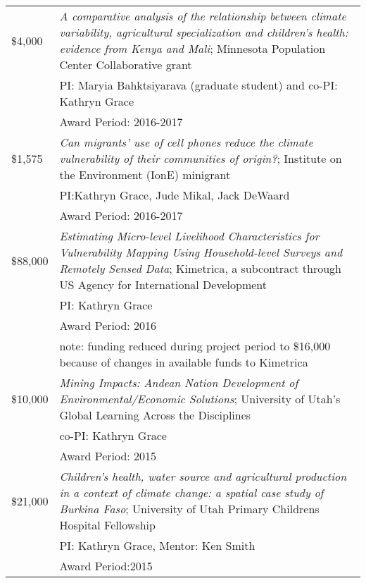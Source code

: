 \documentclass[11pt]{article} %
\begin{document}
\begin{tabular}{lp{11cm}}

\$4,000& \emph{A comparative analysis of the relationship between climate variability, agricultural specialization and children's health:  evidence from Kenya and Mali}; Minnesota Population Center Collaborative grant\\
&PI: Maryia Bahktsiyarava (graduate student) and co-PI: Kathryn Grace\\
&Award Period: 2016-2017\\




\$1,575& \emph{Can migrants' use of cell phones reduce the climate vulnerability of their communities of origin?}; Institute on the Environment (IonE) minigrant\\
&PI:Kathryn Grace, Jude Mikal, Jack DeWaard\\
&Award Period: 2016-2017\\






\$88,000& \emph{Estimating Micro-level Livelihood Characteristics for Vulnerability Mapping Using Household-level Surveys and Remotely Sensed Data}; Kimetrica, a subcontract through US Agency for International Development\\
&PI: Kathryn Grace\\
&Award Period: 2016\\
&note: funding reduced during project period to \$16,000 because of changes in available funds to Kimetrica\\



\$10,000& \emph{Mining Impacts: Andean Nation Development of Environmental/Economic Solutions}; University of Utah's Global Learning Across the Disciplines\\
&co-PI: Kathryn Grace\\
&Award Period: 2015\\



\$21,000& \emph{Children's health, water source and agricultural production in a context of climate change: a spatial case study of Burkina Faso}; University of Utah Primary Childrens Hospital Fellowship\\
&PI: Kathryn Grace, Mentor: Ken Smith\\
&Award Period:2015\\




\end{tabular}
\end{document}
